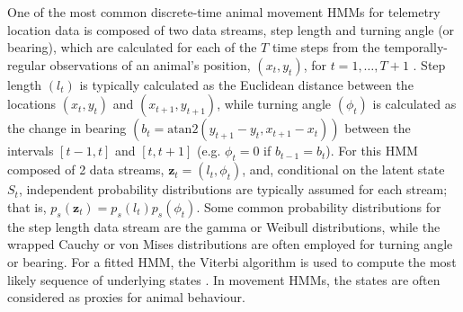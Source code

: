\documentclass[12pt]{article}\usepackage[]{graphicx}\usepackage[]{color}
\begin{document}
One of the most common discrete-time animal movement HMMs for telemetry location data is composed of two data streams, step length and turning angle (or bearing), which are calculated for each of the $T$ time steps from the temporally-regular observations of an animal's position, $(x_t,y_t)$, for $t=1,\ldots,T+1$ \citep[e.g.][]{MoralesEtAl2004,LangrockEtAl2012,McClintockEtAl2012}. Step length $(l_t)$ is typically calculated as the Euclidean distance between the locations $(x_t,y_t)$ and $(x_{t+1},y_{t+1})$, while turning angle $(\phi_t)$ is calculated as the change in bearing $\left(b_t=\text{atan2}(y_{t+1}-y_t,x_{t+1}-x_t)\right)$ between the intervals $[t-1,t]$ and $[t,t+1]$ (e.g. $\phi_t=0$ if $b_{t-1}=b_t$). For this HMM composed of 2 data streams, ${\mathbf z}_t=(l_t,\phi_t)$, and, conditional on the latent state $S_t$, independent probability distributions are typically assumed for each stream; that is, $p_s({\mathbf z}_t)=p_s(l_t)p_s(\phi_t)$. Some common probability distributions for the step length data stream are the gamma or Weibull distributions, while the wrapped Cauchy or von Mises distributions are often employed for turning angle or bearing. For a fitted HMM, the Viterbi algorithm is used to compute the most likely sequence of underlying states \citep{ZucchiniEtAl2016}. In movement HMMs, the states are often considered as proxies for animal behaviour.
\end{document}
